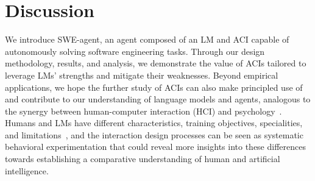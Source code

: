 \section{Discussion}
\label{sec:discuss}

We introduce SWE-agent, an agent composed of an LM and ACI capable of autonomously solving software engineering tasks.
Through our design methodology, results, and analysis, we demonstrate the value of ACIs tailored to leverage LMs' strengths and mitigate their weaknesses.
Beyond empirical applications, we hope the further study of ACIs can also make principled use of and contribute to our understanding of language models and agents, analogous to the synergy between human-computer interaction (HCI) and psychology~\citep{carroll1997human}.
Humans and LMs have different characteristics, training objectives, specialities, and limitations~\citep{griffiths2020understanding,mccoy2023embers}, and the interaction design processes can be seen as systematic behavioral experimentation that could reveal more insights into these differences towards establishing a comparative understanding of human and artificial intelligence.
